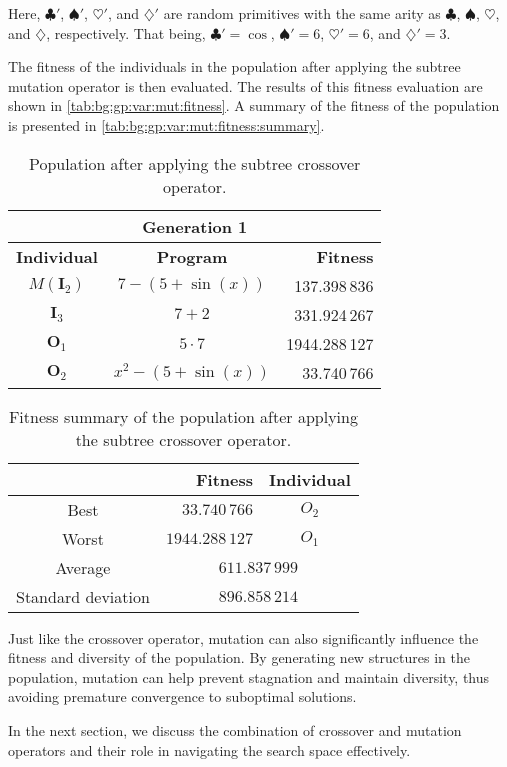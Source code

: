   Here, \(\clubsuit'\), \(\spadesuit'\), \(\heartsuit'\), and \(\diamondsuit'\)
  are random primitives with the same arity as \(\clubsuit\), \(\spadesuit\),
  \(\heartsuit\), and \(\diamondsuit\), respectively.
  That being, \(\clubsuit' = \cos\), \(\spadesuit' = 6\), \(\heartsuit' = 6\),
  and \(\diamondsuit' = 3\).

  The fitness of the individuals in the population after applying the subtree 
  mutation operator is then evaluated.
  The results of this fitness evaluation are shown in 
  \vref{tab:bg:gp:var:mut:fitness}.
  A summary of the fitness of the population is presented in 
  \vref{tab:bg:gp:var:mut:fitness:summary}.

  \begin{table}[ht!]
    \centering
    \begin{tabular}{c|c|r}
      \multicolumn{3}{c}{\textbf{Generation 1}} \\
      \hline
      \hline
      \textbf{Individual} & \textbf{Program}        & \textbf{Fitness} \\
      \hline
      \(M(\mathbf{I}_2)\) & \(7 - (5 + \sin(x))\)   & 137.398\,836 \\
      \(\mathbf{I}_3\)    & \(7 + 2\)               & 331.924\,267 \\
      \(\mathbf{O}_1\)    & \(5 \cdot 7\)           & 1944.288\,127 \\
      \(\mathbf{O}_2\)    & \(x^2 - (5 + \sin(x))\) & 33.740\,766
    \end{tabular}
    \caption{Population after applying the subtree crossover operator.}
    \label{tab:bg:gp:var:mut:fitness}
  \end{table}

  \begin{table}[H]
    \centering
    \begin{tabular}{|c|r|c|}
      \hline
            & \textbf{Fitness} & \textbf{Individual}  \\
      \hline
      Best  & \(33.740\,766\) & \(O_2\) \\
      Worst & \(1944.288\,127\) & \(O_1\) \\
      \hline
      \hline
      Average & \multicolumn{2}{c|}{\(611.837\,999\)} \\
      \hline
      Standard deviation & \multicolumn{2}{c|}{\(896.858\,214\)} \\
      \hline
    \end{tabular}
    \caption{
      Fitness summary of the population after applying the subtree crossover
      operator.
    }
    \label{tab:bg:gp:var:mut:fitness:summary}
  \end{table}

Just like the crossover operator, mutation can also significantly influence 
the fitness and diversity of the population. By generating new structures 
in the population, mutation can help prevent stagnation and maintain diversity, 
thus avoiding premature convergence to suboptimal solutions.

In the next section, we discuss the combination of crossover and mutation 
operators and their role in navigating the search space effectively.
